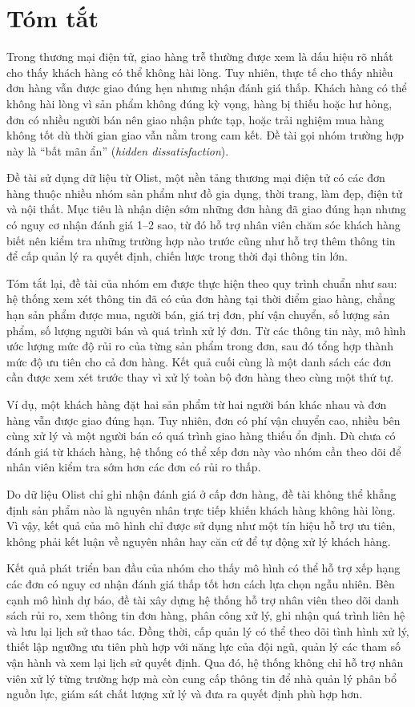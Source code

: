 \documentclass[12pt,a4paper]{report}
\begin{document}
 \chapter*{Tóm tắt}

Trong thương mại điện tử, giao hàng trễ thường được xem là dấu hiệu rõ nhất cho thấy khách hàng có thể không hài lòng. Tuy nhiên, thực tế cho thấy nhiều đơn hàng vẫn được giao đúng hẹn nhưng nhận đánh giá thấp. Khách hàng có thể không hài lòng vì sản phẩm không đúng kỳ vọng, hàng bị thiếu hoặc hư hỏng, đơn có nhiều người bán nên giao nhận phức tạp, hoặc trải nghiệm mua hàng không tốt dù thời gian giao vẫn nằm trong cam kết. Đề tài gọi nhóm trường hợp này là ``bất mãn ẩn'' (\emph{hidden dissatisfaction}).

Đề tài sử dụng dữ liệu từ Olist, một nền tảng thương mại điện tử có các đơn hàng thuộc nhiều nhóm sản phẩm như đồ gia dụng, thời trang, làm đẹp, điện tử và nội thất. Mục tiêu là nhận diện sớm những đơn hàng đã giao đúng hạn nhưng có nguy cơ nhận đánh giá 1--2 sao, từ đó hỗ trợ nhân viên chăm sóc khách hàng biết nên kiểm tra những trường hợp nào trước cũng như hỗ trợ thêm thông tin để cấp quản lý ra quyết định, chiến lược trong thời đại thông tin lớn.

Tóm tắt lại, đề tài của nhóm em được thực hiện theo quy trình chuẩn như sau: hệ thống xem xét thông tin đã có của đơn hàng tại thời điểm giao hàng, chẳng hạn sản phẩm được mua, người bán, giá trị đơn, phí vận chuyển, số lượng sản phẩm, số lượng người bán và quá trình xử lý đơn. Từ các thông tin này, mô hình ước lượng mức độ rủi ro của từng sản phẩm trong đơn, sau đó tổng hợp thành mức độ ưu tiên cho cả đơn hàng. Kết quả cuối cùng là một danh sách các đơn cần được xem xét trước thay vì xử lý toàn bộ đơn hàng theo cùng một thứ tự.

Ví dụ, một khách hàng đặt hai sản phẩm từ hai người bán khác nhau và đơn hàng vẫn được giao đúng hạn. Tuy nhiên, đơn có phí vận chuyển cao, nhiều bên cùng xử lý và một người bán có quá trình giao hàng thiếu ổn định. Dù chưa có đánh giá từ khách hàng, hệ thống có thể xếp đơn này vào nhóm cần theo dõi để nhân viên kiểm tra sớm hơn các đơn có rủi ro thấp.

Do dữ liệu Olist chỉ ghi nhận đánh giá ở cấp đơn hàng, đề tài không thể khẳng định sản phẩm nào là nguyên nhân trực tiếp khiến khách hàng không hài lòng. Vì vậy, kết quả của mô hình chỉ được sử dụng như một tín hiệu hỗ trợ ưu tiên, không phải kết luận về nguyên nhân hay căn cứ để tự động xử lý khách hàng.

Kết quả phát triển ban đầu của nhóm cho thấy mô hình có thể hỗ trợ xếp hạng các đơn có nguy cơ nhận đánh giá thấp tốt hơn cách lựa chọn ngẫu nhiên. Bên cạnh mô hình dự báo, đề tài xây dựng hệ thống hỗ trợ nhân viên theo dõi danh sách rủi ro, xem thông tin đơn hàng, phân công xử lý, ghi nhận quá trình liên hệ và lưu lại lịch sử thao tác. Đồng thời, cấp quản lý có thể theo dõi tình hình xử lý, thiết lập ngưỡng ưu tiên phù hợp với năng lực của đội ngũ, quản lý các tham số vận hành và xem lại lịch sử quyết định. Qua đó, hệ thống không chỉ hỗ trợ nhân viên xử lý từng trường hợp mà còn cung cấp thông tin để nhà quản lý phân bổ nguồn lực, giám sát chất lượng xử lý và đưa ra quyết định phù hợp hơn.
\end{document}

